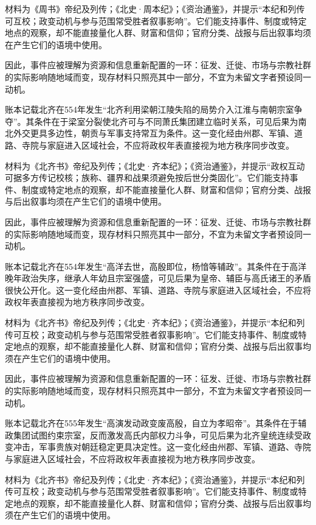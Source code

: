 材料为《周书》帝纪及列传；《北史·周本纪》；《资治通鉴》，并提示“本纪和列传可互校；政变动机与参与范围常受胜者叙事影响”。它们能支持事件、制度或特定地点的观察，却不能直接量化人群、财富和信仰；官府分类、战报与后出叙事均须在产生它们的语境中使用。

因此，事件应被理解为资源和信息重新配置的一环：征发、迁徙、市场与宗教社群的实际影响随地域而变，现存材料只照亮其中一部分，不宜为未留文字者预设同一动机。

账本记载北齐在554年发生“北齐利用梁朝江陵失陷的局势介入江淮与南朝宗室争夺”。其条件在于梁室分裂使北齐可与不同萧氏集团建立临时关系，可见后果为南北外交更具多边性，朝贡与军事支持常互为条件。这一变化经由州郡、军镇、道路、寺院与家庭进入区域社会，不应将政权年表直接视为地方秩序同步改变。

材料为《北齐书》帝纪及列传；《北史·齐本纪》；《资治通鉴》，并提示“政权互动可据多方传记校核；族称、疆界和战果须避免按后世分类固化”。它们能支持事件、制度或特定地点的观察，却不能直接量化人群、财富和信仰；官府分类、战报与后出叙事均须在产生它们的语境中使用。

因此，事件应被理解为资源和信息重新配置的一环：征发、迁徙、市场与宗教社群的实际影响随地域而变，现存材料只照亮其中一部分，不宜为未留文字者预设同一动机。

账本记载北齐在554年发生“高洋去世，高殷即位，杨愔等辅政”。其条件在于高洋晚年政治失序，继承人年幼且宗室强盛，可见后果为皇帝、辅臣与高氏诸王的矛盾很快公开化。这一变化经由州郡、军镇、道路、寺院与家庭进入区域社会，不应将政权年表直接视为地方秩序同步改变。

材料为《北齐书》帝纪及列传；《北史·齐本纪》；《资治通鉴》，并提示“本纪和列传可互校；政变动机与参与范围常受胜者叙事影响”。它们能支持事件、制度或特定地点的观察，却不能直接量化人群、财富和信仰；官府分类、战报与后出叙事均须在产生它们的语境中使用。

因此，事件应被理解为资源和信息重新配置的一环：征发、迁徙、市场与宗教社群的实际影响随地域而变，现存材料只照亮其中一部分，不宜为未留文字者预设同一动机。

账本记载北齐在555年发生“高演发动政变废高殷，自立为孝昭帝”。其条件在于辅政集团试图约束宗室，反而激发高氏内部权力斗争，可见后果为北齐皇统连续受政变冲击，军事贵族对朝廷稳定更具决定性。这一变化经由州郡、军镇、道路、寺院与家庭进入区域社会，不应将政权年表直接视为地方秩序同步改变。

材料为《北齐书》帝纪及列传；《北史·齐本纪》；《资治通鉴》，并提示“本纪和列传可互校；政变动机与参与范围常受胜者叙事影响”。它们能支持事件、制度或特定地点的观察，却不能直接量化人群、财富和信仰；官府分类、战报与后出叙事均须在产生它们的语境中使用。

